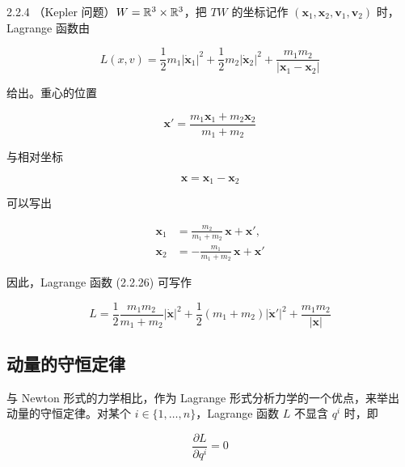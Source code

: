 \begin{example}{2.2.4}
（Kepler 问题）$W=\mathbb{R}^3\times\mathbb{R}^3$，把 $TW$ 的坐标记作
$(\bm{x}_1,\bm{x}_2,\bm{v}_1,\bm{v}_2)$ 时，Lagrange 函数由

\begin{equation}
  L(x,v) = \frac{1}{2}m_1|\dot{\bm{x}}_1|^2
    + \frac{1}{2}m_2|\dot{\bm{x}}_2|^2
    + \frac{m_1m_2}{|\bm{x}_1 - \bm{x}_2|}
  \tag{2.2.26}
\end{equation}

给出。重心的位置

\begin{equation}
  \bm{x}' = \frac{m_1\bm{x}_1 + m_2\bm{x}_2}{m_1 + m_2}
  \tag{2.2.27}
\end{equation}

与相对坐标

\begin{equation}
  \bm{x} = \bm{x}_1 - \bm{x}_2
  \tag{2.2.28}
\end{equation}

可以写出

\begin{align}
  \bm{x}_1 &= \frac{m_2}{m_1 + m_2}\,\bm{x} + \bm{x}', \tag{2.2.29}\\
  \bm{x}_2 &= -\frac{m_1}{m_1 + m_2}\,\bm{x} + \bm{x}'
  \tag{2.2.30}
\end{align}

因此，Lagrange 函数 (2.2.26) 可写作

\begin{equation}
  L = \frac{1}{2}\frac{m_1m_2}{m_1 + m_2}|\dot{\bm{x}}|^2
    + \frac{1}{2}(m_1 + m_2)|\dot{\bm{x}}'|^2
    + \frac{m_1m_2}{|\bm{x}|}
  \tag{2.2.31}
\end{equation}
\end{example}

\subsection{动量的守恒定律}

与 Newton 形式的力学相比，作为 Lagrange 形式分析力学的一个优点，来举出
动量的守恒定律。对某个 $i\in\{1,\dots,n\}$，Lagrange 函数 $L$ 不显含
$q^i$ 时，即

\begin{equation}
  \frac{\partial L}{\partial q^i} = 0
  \tag{2.2.32}
\end{equation}

